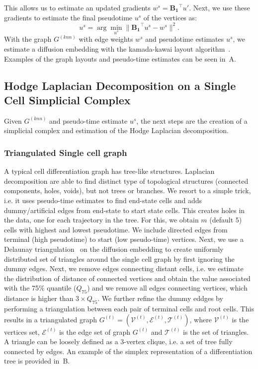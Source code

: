 \noindent This allows us to estimate an updated gradients $w^s=\mathbf{B_1}^\top u'$. Next, we use these gradients to estimate the final pseudotime $u^s$ of the vertices as:
\begin{equation}
    u^s = \arg\underset{u^s}{\min} \| \mathbf{B_1}^\top u^s - w^s\|^2.
\end{equation}
\noindent With the graph $G^{(knn)}$ with edge weights $w^s$ and pseudotime estimates $u^s$, we estimate a diffusion embedding with the kamada-kawai layout algorithm~\citep{gansner2004graph, ortmann2016sparse}. Examples of the graph layouts and pseudo-time estimates can be seen in~A.

\subsection{Hodge Laplacian Decomposition on a Single Cell Simplicial Complex}

Given $G^{(knn)}$ and pseudo-time estimate $u^s$, the next steps are the creation of a simplicial complex and estimation of the Hodge Laplacian decomposition.

\subsubsection{Triangulated Single cell graph}

A typical cell differentiation graph has tree-like structures. Laplacian decomposition are able to find distinct type of topological structures (connected components, holes, voids), but not trees or branches. We resort to a simple trick, i.e. it uses pseudo-time estimates to find end-state cells and adds dummy/artificial edges from end-state to start state cells.  This creates holes in the data, one for each trajectory in the tree. For this, we obtain $m$ (default 5) cells with highest and lowest pseudotime. We include directed edges from terminal (high pseudotime) to start (low pseudo-time) vertices. Next, we use a Delaunay triangulation~\citep{delaunay1934bulletin} on the diffusion embedding to create uniformly distributed set of triangles around the single cell graph by first ignoring the dummy edges. Next, we remove edges connecting distant cells, i.e. we estimate the distribution of distance of connected vertices and obtain the value associated with the 75$\%$ quantile ($Q_{75}$) and we remove all edges connecting vertices, which distance is higher than $3\times Q_{75}$. We further refine the dummy eddges by performing a triangulation between each pair of terminal cells and root cells. This results in a triangulated graph $G^{(t)} = (\mathcal{V}^{(t)},\mathcal{E}^{(t)},\mathcal{T}^{(t)})$, where $\mathcal{V}^{(t)}$ is the vertices set, $\mathcal{E}^{(t)}$ is the edge set of graph $G^{(t)}$ and $\mathcal{T}^{(t)}$ is the set of triangles. A triangle can be loosely defined as a 3-vertex clique, i.e. a set of tree fully connected by edges. An example of the simplex representation of a differentiation tree is provided in~B.


